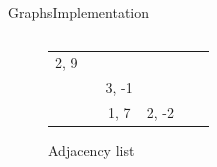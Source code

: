 \begin{frame}{Graphs}{Implementation}
\begin{columns}
\begin{column}{0.45\linewidth}
\begin{figure}[!h]
\begin{tabular}{p{0.25em}p{1.0em}p{1.0em}p{1.0em}p{1.0em}p{1.0em}}
          \multicolumn{1}{|c|}{{\color{Mittel-Blau}2}, \color{Mittel-Gruen}9}\\
          \cline{3-3}
          {} & {%
            \def\verticenumber{2}%
          } &
          \multicolumn{1}{|c|}{{\color{Mittel-Blau}3}, \color{Mittel-Gruen}-1}\\
          \cline{3-4}
          {} & {%
            \def\verticenumber{3}%
          } &
          \multicolumn{1}{|c|}{{\color{Mittel-Blau}1}, \color{Mittel-Gruen}7} &
          \multicolumn{1}{c|}{{\color{Mittel-Blau}2}, \color{Mittel-Gruen}-2}\\
          \cline{3-4}
        \end{tabular}
        \caption{Adjacency list}
      \end{figure}
    \end{column}
  \end{columns}
\end{frame}


